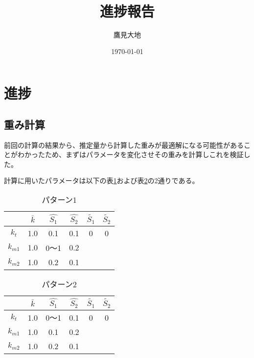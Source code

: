 \documentclass[a4paper,11pt]{jsarticle}
\begin{document}
\title{進捗報告}
\author{鷹見大地}
\date{\today}
\maketitle


\section{進捗}
\subsection{重み計算}
前回の計算の結果から、推定量から計算した重みが最適解になる可能性があることがわかったため、まずはパラメータを変化させその重みを計算しこれを検証した。

計算に用いたパラメータは以下の表\ref{table:1}および表\ref{table:2}の2通りである。

\begin{table}[H]
  \centering
  \caption{パターン1}
  \begin{tabular}{|c|c|c|c|c|c|}
  \hline
        & $\bar{k}$ & $\hat{S_1}$ & $\hat{S_2}$ & $\tilde{S_1}$ & $\tilde{S_2}$ \\ \hline
  $k_t$    & 1.0     & 0.1       & 0.1       & 0           & 0           \\ \hline
  $k_{m1}$ & 1.0     & 0〜1       & 0.2       &             &             \\ \hline
  $k_{m2}$ & 1.0     & 0.2       & 0.1       &             &             \\ \hline
  \end{tabular}
  \label{table:1}
\end{table}

\begin{table}[H]
  \centering
  \caption{パターン2}
  \begin{tabular}{|c|c|c|c|c|c|}
  \hline
        & $\bar{k}$ & $\hat{S_1}$ & $\hat{S_2}$ & $\tilde{S_1}$ & $\tilde{S_2}$ \\ \hline
  $k_t$    & 1.0     & 0〜1       & 0.1       & 0           & 0           \\ \hline
  $k_{m1}$ & 1.0     & 0.1       & 0.2       &             &             \\ \hline
  $k_{m2}$ & 1.0     & 0.2       & 0.1       &             &             \\ \hline
  \end{tabular}
  \label{table:2}
\end{table}
\end{document}
